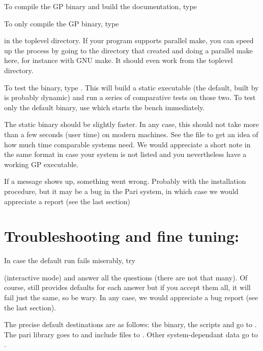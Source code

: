  To compile the GP binary and build the
documentation, type


\noindent To only compile the GP binary, type


\noindent in the toplevel directory. If your  program supports
parallel make, you can speed up the process by going to the 
directory that  created and doing a parallel make here, for
instance  with GNU make. It should even work from the toplevel
directory.


To test the binary, type . This will build a static
executable (the default, built by  is probably dynamic) and
run a series of comparative tests on those two. To test only the default
binary, use  which starts the bench immediately.

The static binary should be slightly faster. In any case, this should not
take more than a few seconds (user time) on modern machines. See the file
 to get an idea of how much time comparable systems need.
We would appreciate a short note in the same format in case your system is
not listed and you nevertheless have a working GP executable.

If a \kbd{[BUG]} message shows up, something went wrong. Probably with the
installation procedure, but it may be a bug in the Pari system, in which
case we would appreciate a report (see the last section)

\section{Troubleshooting and fine tuning:} 
In case the default  run fails miserably, try


\noindent (interactive mode) and answer all the questions (there are not that
many). Of course,  still provides defaults for each answer
but if you accept them all, it will fail just the same, so be wary. In any
case, we would appreciate a bug report (see the last section).

 The precise default destinations are as
follows: the  binary, the scripts  and  go
to . The pari library goes to  and
include files to . Other system-dependant data go
to .

